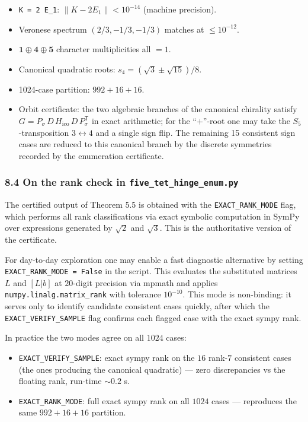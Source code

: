 \documentclass[
]{article}
\providecommand{\tightlist}{%
  \setlength{\itemsep}{0pt}\setlength{\parskip}{0pt}}
\begin{document}
\begin{itemize}
\tightlist
\item
  \texttt{K\ =\ 2\ E\_1}: \(\|K - 2 E_1\| < 10^{-14}\) (machine
  precision).
\item
  Veronese spectrum \((2/3, -1/3, -1/3)\) matches at \(\le 10^{-12}\).
\item
  \(\mathbf 1 \oplus \mathbf 4 \oplus \mathbf 5\) character
  multiplicities all \(= 1\).
\item
  Canonical quadratic roots: \(s_4 = (\sqrt{3} \pm \sqrt{15})/8\).
\item
  1024-case partition: \(992 + 16 + 16\).
\item
  Orbit certificate: the two algebraic branches of the canonical
  chirality satisfy
  \(G = P_\sigma\,D\,H_{\mathrm{ico}}\,D\,P_\sigma^{\mathsf T}\) in
  exact arithmetic; for the ``\(+\)''-root one may take the
  \(S_5\)-transposition \(3 \leftrightarrow 4\) and a single sign flip.
  The remaining 15 consistent sign cases are reduced to this canonical
  branch by the discrete symmetries recorded by the enumeration
  certificate.
\end{itemize}

\subsubsection{\texorpdfstring{8.4 On the rank check in
\texttt{five\_tet\_hinge\_enum.py}}{8.4 On the rank check in five\_tet\_hinge\_enum.py}}\label{on-the-rank-check-in-five_tet_hinge_enum.py}

The certified output of Theorem 5.5 is obtained with the
\texttt{EXACT\_RANK\_MODE} flag, which performs all rank classifications
via exact symbolic computation in SymPy over expressions generated by
\(\sqrt{2}\) and \(\sqrt{3}\). This is the authoritative version of the
certificate.

For day-to-day exploration one may enable a fast diagnostic alternative
by setting \texttt{EXACT\_RANK\_MODE\ =\ False} in the script. This
evaluates the substituted matrices \(L\) and \([L|b]\) at \(20\)-digit
precision via mpmath and applies \texttt{numpy.linalg.matrix\_rank} with
tolerance \(10^{-10}\). This mode is non-binding: it serves only to
identify candidate consistent cases quickly, after which the
\texttt{EXACT\_VERIFY\_SAMPLE} flag confirms each flagged case with the
exact sympy rank.

In practice the two modes agree on all \(1024\) cases:

\begin{itemize}
\tightlist
\item
  \texttt{EXACT\_VERIFY\_SAMPLE}: exact sympy rank on the \(16\)
  rank-\(7\) consistent cases (the ones producing the canonical
  quadratic) --- zero discrepancies vs the floating rank, run-time
  \(\sim 0.2\) s.
\item
  \texttt{EXACT\_RANK\_MODE}: full exact sympy rank on all \(1024\)
  cases --- reproduces the same \(992 + 16 + 16\) partition.
\end{itemize}
\end{document}
